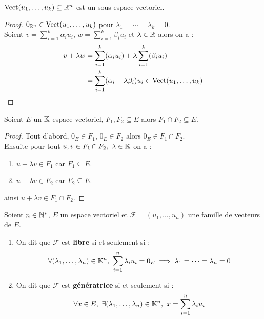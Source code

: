 \begin{proposition}
	$\operatorname{Vect}(u_1, \ldots, u_k) \subseteq \mathbb{R}^n$ est un sous-espace vectoriel.
\end{proposition}

\begin{proof}
	$0_{\mathbb{R}^n} \in \operatorname{Vect}(u_1, \ldots, u_k)$ pour $\lambda_1 = \cdots = \lambda_k = 0$.
	\\
	Soient $v = \sum_{i=1}^{k} \alpha_i u_i$, $w = \sum_{i=1}^{k} \beta_i u_i$ et $\lambda \in \mathbb{R}$ alors on a :
	\begin{align*}
		v + \lambda w &= \sum_{i=1}^{k} (\alpha_i u_i) + \lambda \sum_{i=1}^{k} (\beta_i u_i) \\
		&= \sum_{i=1}^{k} (\alpha_i + \lambda \beta_i) u_i \in \operatorname{Vect}(u_1, \ldots, u_k)
	\end{align*}
\end{proof}

\begin{proposition}
	Soient $E$ un $\mathbb{K}$-espace vectoriel, $F_1, F_2 \subseteq E$ alors $F_1 \cap F_2 \subseteq E$.
\end{proposition}

\begin{proof}
	Tout d'abord, $0_E \in F_1$, $0_E \in F_2$ alors $0_E \in F_1 \cap F_2$.
	\\
	Ensuite pour tout $u, v \in F_1 \cap F_2,\ \lambda \in \K$ on a :
	\begin{enumerate}
		\item $u + \lambda v \in F_1$ car $F_1 \subseteq E$. 
		\item $u + \lambda v \in F_2$ car $F_2 \subseteq E$.
	\end{enumerate}
	ainsi $u + \lambda v \in F_1 \cap F_2$.
\end{proof}

\begin{definition}
	Soient $n \in \mathbb{N}^*$, $E$ un espace vectoriel et $\mathcal{F} = (u_1, \ldots, u_n)$ une famille de vecteurs de $E$.
	\begin{enumerate}
		\item On dit que $\mathcal{F}$ est \textbf{libre} si et seulement si :
		\begin{align*}
			\forall (\lambda_1, \ldots, \lambda_n) \in \mathbb{K}^n,\ \sum_{i = 1}^n \lambda_i u_i = 0_E \implies \lambda_1 = \cdots = \lambda_n = 0
		\end{align*}
		\item On dit que $\mathcal{F}$ est \textbf{génératrice} si et seulement si :
		\begin{align*}
			\forall x \in E,\ \exists (\lambda_1, \ldots, \lambda_n) \in \mathbb{K}^n,\ x = \sum_{i = 1}^n \lambda_i u_i 
		\end{align*}
	\end{enumerate}
\end{definition}

